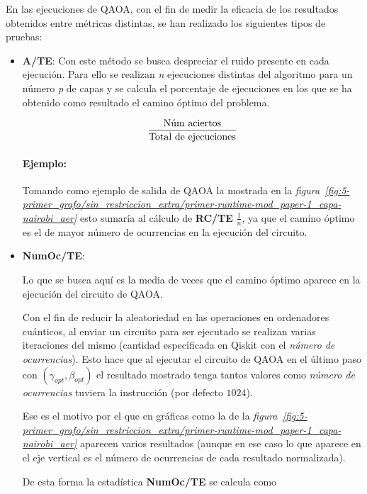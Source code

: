 En las ejecuciones de QAOA, con el fin de medir la eficacia de los resultados obtenidos entre métricas distintas, se han realizado los siguientes tipos de pruebas:

\begin{itemize}
\item \textbf{A/TE}:
  Con este método se busca despreciar el ruido presente en cada ejecución.
  Para ello se realizan \textit{n} ejecuciones distintas del algoritmo para un número \textit{p} de capas y se calcula el porcentaje de ejecuciones en los que se ha obtenido como resultado el camino óptimo del problema.

  \begin{align*}
    \frac{\textnormal{Núm aciertos}}{\textnormal{Total de ejecuciones}}
  \end{align*}

  \paragraph{Ejemplo:}
  Tomando como ejemplo de salida de QAOA la mostrada en la \textit{figura~\ref{fig:5-primer_grafo/sin_restriccion_extra/primer-runtime-mod_paper-1_capa-nairobi_aer}} esto sumaría al cálculo de \textbf{RC/TE} $\frac{1}{n}$, ya que el camino óptimo es el de mayor número de ocurrencias en la ejecución del circuito.
  
\item \textbf{NumOc/TE}:

  Lo que se busca aquí es la media de veces que el camino óptimo aparece en la ejecución del circuito de QAOA\@.

  Con el fin de reducir la aleatoriedad en las operaciones en ordenadores cuánticos, al enviar un circuito para ser ejecutado se realizan varias iteraciones del mismo (cantidad especificada en Qiskit con el \textit{número de ocurrencias}).
  Esto hace que al ejecutar el circuito de QAOA en el último paso con $(\gamma_{opt}, \beta_{opt})$ el resultado mostrado tenga tantos valores como \textit{número de ocurrencias} tuviera la instrucción (por defecto $1024$).

  Ese es el motivo por el que en gráficas como la de la \textit{figura~\ref{fig:5-primer_grafo/sin_restriccion_extra/primer-runtime-mod_paper-1_capa-nairobi_aer}} aparecen varios resultados (aunque en ese caso lo que aparece en el eje vertical es el número de ocurrencias de cada resultado normalizada).

  De esta forma la estadística \textbf{NumOc/TE} se calcula como


\end{itemize}
